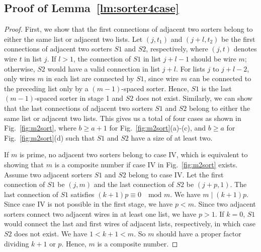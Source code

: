 \documentclass[10pt,journal,cspaper,compsoc]{IEEEtran}
\begin{document}
\subsection{Proof of Lemma~\ref{lm:sorter4case}}
\label{pf:sorter4case}
\begin{proof}
 First, we show that the first connections of adjacent two sorters belong to either the same list or adjacent two lists. Let $(j,t_1)$ and $(j+l,t_2)$ be the first connections of adjacent two sorters $S1$ and $S2$, respectively, where $(j,t)$ denotes wire $t$ in list $j$.
 If $l>1$, the connection of $S1$ in list $j+l-1$ should be wire $m$; otherwise, $S2$ would have a valid connection in list $j+l$. For lists $j$ to $j+l-2$, only wires $m$ in each list are connected by $S1$, since wire $m$ can be connected to the preceding list only by a $(m-1)$-spaced sorter. Hence, $S1$ is the last $(m-1)$-spaced sorter in stage 1 and $S2$ does not exist.
 Similarly, we can show that the last connections of adjacent two sorters $S1$ and $S2$ belong to either the same list or adjacent two lists. This gives us a total of four cases as shown in Fig.~\ref{fig:m2sort}, where $b\ge a+1$ for Fig.~\ref{fig:m2sort}(a)-(c), and $b\ge a$ for Fig.~\ref{fig:m2sort}(d) such that $S1$ and $S2$ have a size of at least two.

 If $m$ is prime, no adjacent two sorters belong to case IV, which is equivalent to showing that $m$ is a composite number if case IV in Fig.~\ref{fig:m2sort} exists. Assume two adjacent sorters $S1$ and $S2$ belong to case IV. Let the first connection of $S1$ be $(j,m)$ and the last connection of $S2$ be $(j+p, 1)$. The last connection of $S1$ satisfies $(k+1)p \equiv 0 \quad \mbox{mod }m$. We have $m \mid (k+1)p$. Since case IV is not possible in the first stage, we have $p <m$. Since two adjacent sorters connect two adjacent wires in at least one list, we have $p > 1$.
 If $k=0$, $S1$ would connect the last and first wires of adjacent lists, respectively, in which case $S2$ does not exist. We have $1 < k+1 < m$.
So $m$ should have a proper factor dividing $k+1$ or $p$. Hence, $m$ is a composite number.
\end{proof}
\end{document}
